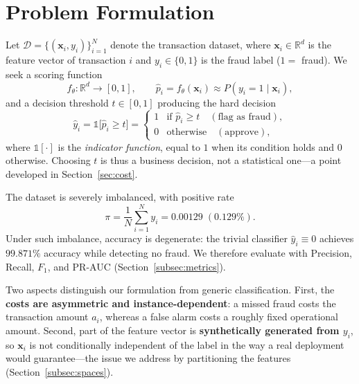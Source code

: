 \documentclass{article}
\begin{document}
\section{Problem Formulation}
\label{sec:formulation}

Let $\mathcal{D} = \{(\mathbf{x}_i, y_i)\}_{i=1}^{N}$ denote the
transaction dataset, where $\mathbf{x}_i \in \mathbb{R}^{d}$ is the
feature vector of transaction $i$ and $y_i \in \{0, 1\}$ is the fraud
label ($1 =$ fraud). We seek a scoring function
\begin{equation}
f_\theta : \mathbb{R}^{d} \rightarrow [0, 1], \qquad
\hat p_i = f_\theta(\mathbf{x}_i) \approx P(y_i = 1 \mid \mathbf{x}_i),
\label{eq:scorer}
\end{equation}
and a decision threshold $t \in [0,1]$ producing the hard decision
\begin{equation}
\hat y_i = \mathds{1}\bigl[\hat p_i \ge t\bigr] =
\begin{cases}
1 & \text{if } \hat p_i \ge t \quad(\text{flag as fraud}),\\[2pt]
0 & \text{otherwise} \quad(\text{approve}),
\end{cases}
\label{eq:decision}
\end{equation}
where $\mathds{1}[\cdot]$ is the \emph{indicator function}, equal to
$1$ when its condition holds and $0$ otherwise. Choosing $t$ is thus a
business decision, not a statistical one---a point developed in
Section~\ref{sec:cost}.

The dataset is severely imbalanced, with positive rate
\begin{equation}
\pi = \frac{1}{N}\sum_{i=1}^{N} y_i = 0.00129 \;(0.129\%).
\label{eq:imbalance}
\end{equation}
Under such imbalance, accuracy is degenerate: the trivial classifier
$\hat y_i \equiv 0$ achieves $99.871\%$ accuracy while detecting no
fraud. We therefore evaluate with Precision, Recall, $F_1$, and
PR-AUC (Section~\ref{subsec:metrics}).

Two aspects distinguish our formulation from generic classification.
First, the \textbf{costs are asymmetric and instance-dependent}: a
missed fraud costs the transaction amount $a_i$, whereas a false alarm
costs a roughly fixed operational amount. Second, part of the feature
vector is \textbf{synthetically generated from $y_i$}, so
$\mathbf{x}_i$ is not conditionally independent of the label in the way
a real deployment would guarantee---the issue we address by
partitioning the features (Section~\ref{subsec:spaces}).
\end{document}
